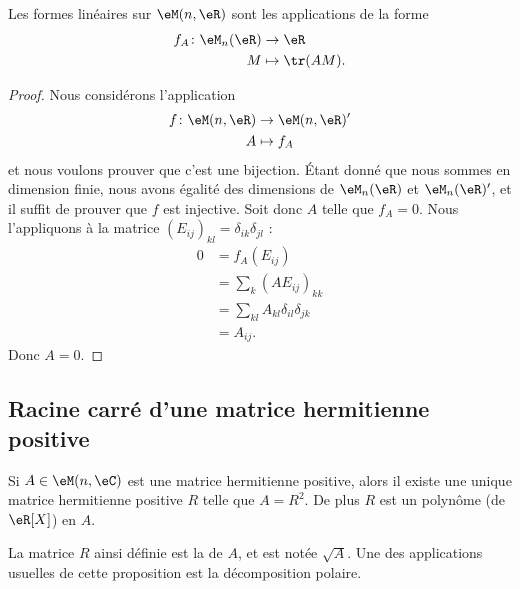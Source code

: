 \begin{lemma}
    Les formes linéaires sur \( \eM(n,\eR)\) sont les applications de la forme
    \begin{equation}
        \begin{aligned}
            f_A\colon \eM_n(\eR)&\to \eR \\
            M&\mapsto \tr(AM). 
        \end{aligned}
    \end{equation}
\end{lemma}

\begin{proof}
    Nous considérons l'application
    \begin{equation}
        \begin{aligned}
            f\colon \eM(n,\eR)&\to \eM(n,\eR)' \\
            A&\mapsto f_A 
        \end{aligned}
    \end{equation}
    et nous voulons prouver que c'est une bijection. Étant donné que nous sommes en dimension finie, nous avons égalité des dimensions de \( \eM_n(\eR)\) et \( \eM_n(\eR)'\), et il suffit de prouver que \( f\) est injective. Soit donc \( A\) telle que \( f_A=0\). Nous l'appliquons à la matrice \( (E_{ij})_{kl}=\delta_{ik}\delta_{jl}\) :
    \begin{subequations}
        \begin{align}
            0&=f_A(E_{ij})\\
            &=\sum_{k}(AE_{ij})_{kk}\\
            &=\sum_{kl}A_{kl}\delta_{il}\delta_{jk}\\
            &=A_{ij}.
        \end{align}
    \end{subequations}
    Donc \( A=0\).
\end{proof}

\subsection{Racine carré d'une matrice hermitienne positive}

\begin{proposition}     \label{PropVZvCWn}
    Si \( A\in \eM(n,\eC)\) est une matrice hermitienne positive, alors il existe une unique matrice hermitienne positive \( R\) telle que \( A=R^2\). De plus \( R\) est un polynôme (de \( \eR[X]\)) en \( A\).
\end{proposition}
La matrice \( R\) ainsi définie est la  de \( A\), et est notée \( \sqrt{A}\). Une des applications usuelles de cette proposition est la décomposition polaire.

